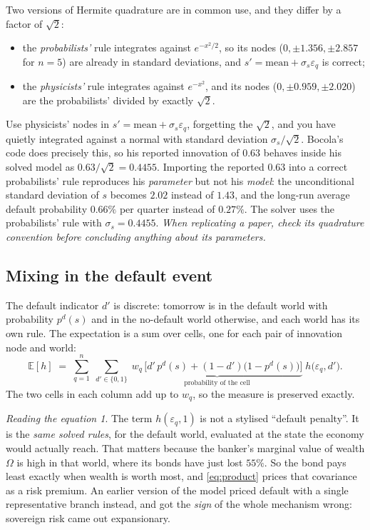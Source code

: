 \documentclass[10pt,a4paper]{article}
\theoremstyle{plain}
\theoremstyle{remark}
\newtheorem*{reading}{Reading the equation}
\newcommand{\E}{\mathbb{E}}
\begin{document}
Two versions of Hermite quadrature are in common use, and they differ by a factor of $\sqrt2$:
\begin{itemize}
\item the \emph{probabilists'} rule integrates against $e^{-x^2/2}$, so its nodes
($0,\pm1.356,\pm2.857$ for $n=5$) are already in standard deviations, and
$s' = \text{mean} + \sigma_s\varepsilon_q$ is correct;
\item the \emph{physicists'} rule integrates against $e^{-x^2}$, and its nodes ($0,\pm0.959,\pm2.020$)
are the probabilists' divided by exactly $\sqrt2$.
\end{itemize}
Use physicists' nodes in $s' = \text{mean}+\sigma_s\varepsilon_q$, forgetting the $\sqrt2$, and you have
quietly integrated against a normal with standard deviation $\sigma_s/\sqrt2$. Bocola's code does
precisely this, so his reported innovation of $0.63$ behaves inside his solved model as
$0.63/\sqrt2 = 0.4455$. Importing the reported $0.63$ into a correct probabilists' rule reproduces his
\emph{parameter} but not his \emph{model}: the unconditional standard deviation of $s$ becomes $2.02$
instead of $1.43$, and the long-run average default probability $0.66\%$ per quarter instead of
$0.27\%$. The solver uses the probabilists' rule with $\sigma_s=0.4455$. \emph{When replicating a
paper, check its quadrature convention before concluding anything about its parameters.}

\subsection{Mixing in the default event}

The default indicator $d'$ is discrete: tomorrow is in the default world with probability
$p^d(s)$ and in the no-default world otherwise, and each world has its own rule. The expectation is
a sum over cells, one for each pair of innovation node and world:
\begin{equation}
  \E[h] \;=\; \sum_{q=1}^{n}\;\sum_{d'\in\{0,1\}}\;
  \underbrace{w_q\,\Big[d'\,p^d(s) + (1-d')\big(1-p^d(s)\big)\Big]}_{\text{probability of the cell}}
  \;h\big(\varepsilon_q,d'\big).
  \label{eq:product}
\end{equation}
The two cells in each column add up to $w_q$, so the measure is preserved exactly.

\begin{reading}
The term $h(\varepsilon_q,1)$ is not a stylised ``default penalty''. It is the \emph{same solved
rules}, for the default world, evaluated at the state the economy would actually reach. That matters
because the banker's marginal value of wealth $\Omega$ is high in that world, where its bonds have just
lost $55\%$. So the bond pays least exactly when wealth is worth most, and \eqref{eq:product} prices
that covariance as a risk premium. An earlier version of the model priced default with a single
representative branch instead, and got the \emph{sign} of the whole mechanism wrong: sovereign risk
came out expansionary.
\end{reading}
\end{document}
